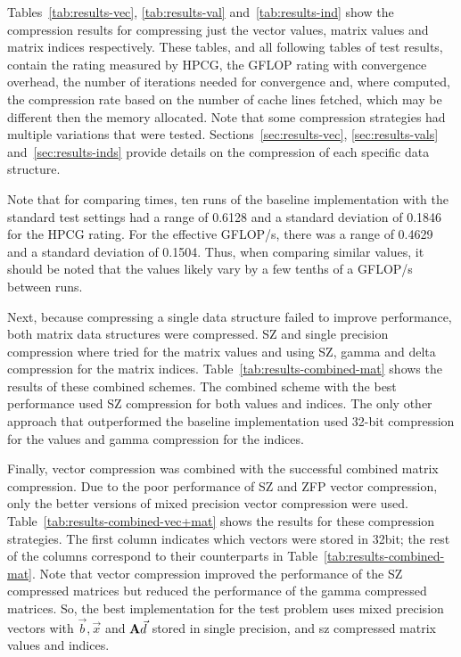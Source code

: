 Tables~\ref{tab:results-vec}, \ref{tab:results-val} and~\ref{tab:results-ind} show the compression results for compressing just the vector values, matrix values and matrix indices respectively.
These tables, and all following tables of test results, contain the rating measured by HPCG, the GFLOP rating with convergence overhead, the number of iterations needed for convergence and, where computed, the compression rate based on the number of cache lines fetched, which may be different then the memory allocated.
Note that some compression strategies had multiple variations that were tested.
Sections~\ref{sec:results-vec}, \ref{sec:results-vals} and~\ref{sec:results-inds} provide details on the compression of each specific data structure.






Note that for comparing times, ten runs of the baseline implementation with the standard test settings had a range of 0.6128 and a standard deviation of 0.1846 for the HPCG rating.
For the effective GFLOP/s, there was a range of 0.4629 and a standard deviation of 0.1504.
Thus, when comparing similar values, it should be noted that the values likely vary by a few tenths of a GFLOP/s between runs.

Next, because compressing a single data structure failed to improve performance, both matrix data structures were compressed.
SZ and single precision compression where tried for the matrix values and using SZ, gamma and delta compression for the matrix indices.
Table~\ref{tab:results-combined-mat} shows the results of these combined schemes.
The combined scheme with the best performance used SZ compression for both values and indices.
The only other approach that outperformed the baseline implementation used 32-bit compression for the values and gamma compression for the indices.



Finally, vector compression was combined with the successful combined matrix compression.
Due to the poor performance of SZ and ZFP vector compression, only the better versions of mixed precision vector compression were used.
Table~\ref{tab:results-combined-vec+mat} shows the results for these compression strategies.
The first column indicates which vectors were stored in 32bit; the rest of the columns correspond to their counterparts in Table~\ref{tab:results-combined-mat}.
Note that vector compression improved the performance of the SZ compressed matrices but reduced the performance of the gamma compressed matrices.
So, the best implementation for the test problem uses mixed precision vectors with \(\vec{b}, \vec{x}\) and \(\mathbf{A}\vec{d}\) stored in single precision, and sz compressed matrix values and indices.

